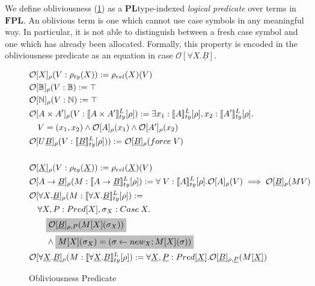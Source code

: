 \documentclass[acmsmall]{acmart}
\newcommand{\den}[1]{\llbracket #1\rrbracket}
\newcommand{\pl}{$\mathbf{PL}$}
\newcommand{\fpl}{$\mathbf{FPL}$}
\begin{document}
We define obliviousness (\cref{fig:Oblivious}) as a \pl\;type-indexed \textit{logical predicate} over terms in \fpl. An oblivious term is one which cannot use case symbols in any meaningful way. In particular, it is not able to distinguish between a fresh case symbol and one which has already been allocated. Formally, this property is encoded in the obliviousness predicate as an equation in case $\mathcal{O}[\forall X. \underline{B}]$.


\begin{figure}[H]
  \centering
  \scriptsize
  \begin{align*}
    &\mathcal{O}[X]_{\rho}(V :\rho_{ty}(X)) := \rho_{rel}(X)(V)\\
    &\mathcal{O}[\mathbb{B}]_{\rho} (V : \mathbb{B}):= \top \\%
    &\mathcal{O}[\mathbb{N}]_{\rho}(V : \mathbb{N}) := \top\\%
    &\mathcal{O}[A \times A']_{\rho}(V : \den{A\times A'}^L_{ty}[\rho]) := \exists x_1:\den{A}^L_{ty}[\rho],x_2:\den{A'}^L_{ty}[\rho].\\
    &\quad V = (x_1,x_2) \land \mathcal{O}[A]_{\rho}(x_1) \land \mathcal{O}[A']_{\rho}(x_2)\\
    &\mathcal{O}[U\underline{B}]_{\rho}(V : \den{\underline{B}}^L_{ty}[\rho] )) := \mathcal{O}[\underline{B}]_{\rho}(force\;V)\\
    \\
    & \mathcal{O}[\underline{X}]_{\rho}(V: \rho_{ty}(\underline{X})) := \rho_{rel}(\underline{X})(V)\\
    &\mathcal{O}[A\rightarrow \underline{B}]_{\rho}(M : \den{A \rightarrow \underline{B}}^L_{ty}[\rho]) := \forall\; V :\den{A}^L_{ty}[\rho]. \mathcal{O}[A]_{\rho}(V)\implies \mathcal{O}[\underline{B}]_{\rho}(MV) \\
    &\mathcal{O}[\forall X. \underline{B}]_{\rho}(M :\den{\forall X. \underline{B}}^L_{ty}[\rho]) := \\
    &\quad \forall X,P:Pred[X],\sigma_X:Case\:X.\\
    &\quad \quad \colorbox{lightgray}{$\mathcal{O}[\underline{B}]_{{\rho},P}(M[X](\sigma_X))$} \\
    &\quad \quad \land \colorbox{lightgray}{$M[X](\sigma_X) = (\sigma\leftarrow new_X; M[X](\sigma))$}\\
    &\mathcal{O}[\forall \underline{X}. \underline{B}]_{\rho}(M:\den{\forall \underline{X}. \underline{B}}^L_{ty}[\rho]) := \forall \underline{X},\underline{P}: Pred[\underline{X}].\mathcal{O}[\underline{B}]_{\rho,\underline{P}}(M[\underline{X}]) 
\end{align*}
  \caption{Obliviousness Predicate}
  \label{fig:Oblivious}
\end{figure}
\end{document}
